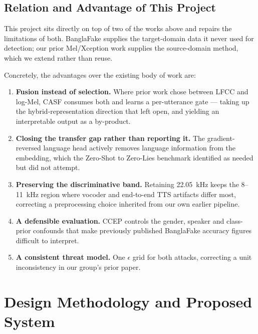 \documentclass[conference]{IEEEtran}
\begin{document}
\subsection{Relation and Advantage of This Project}
This project sits directly on top of two of the works above and repairs the
limitations of both. BanglaFake supplies the target-domain data it never used
for detection; our prior Mel/Xception work supplies the source-domain method,
which we extend rather than reuse.

Concretely, the advantages over the existing body of work are:

\begin{enumerate}
\item \textbf{Fusion instead of selection.} Where prior work chose between
      LFCC and log-Mel, CASF consumes both and learns a per-utterance gate ---
      taking up the hybrid-representation direction that \cite{ahmed2026melspec}
      left open, and yielding an interpretable output as a by-product.
\item \textbf{Closing the transfer gap rather than reporting it.} The
      gradient-reversed language head actively removes language information
      from the embedding, which the Zero-Shot to Zero-Lies benchmark
      identified as needed but did not attempt.
\item \textbf{Preserving the discriminative band.} Retaining 22.05~kHz keeps
      the 8--11~kHz region where vocoder and end-to-end TTS artifacts differ
      most, correcting a preprocessing choice inherited from our own earlier
      pipeline.
\item \textbf{A defensible evaluation.} CCEP controls the gender, speaker and
      class-prior confounds that make previously published BanglaFake accuracy
      figures difficult to interpret.
\item \textbf{A consistent threat model.} One $\epsilon$ grid for both
      attacks, correcting a unit inconsistency in our group's prior paper.
\end{enumerate}

\section{Design Methodology and Proposed System}
\end{document}
